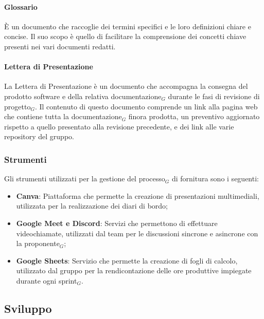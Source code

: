 \documentclass[10pt]{article}
\begin{document}
\begin{justify}
        \paragraph{Glossario}
        È un documento che raccoglie dei termini specifici e le loro definizioni chiare e concise. Il suo scopo è quello di facilitare la comprensione dei concetti chiave presenti nei vari documenti redatti.\\

        \paragraph{Lettera di Presentazione}
        La Lettera di Presentazione è un documento che accompagna la consegna del prodotto software e della relativa documentazione$_G$ durante le fasi di revisione di progetto$_G$. Il contenuto di questo documento comprende un link alla pagina web che contiene tutta la documentazione$_G$ finora prodotta, un preventivo aggiornato rispetto a quello presentato alla revisione precedente, e dei link alle varie repository del gruppo.\\

    \subsubsection{Strumenti}
    Gli strumenti utilizzati per la gestione del processo$_G$ di fornitura sono i seguenti:
    \begin{itemize}
        \item \textbf{Canva}: Piattaforma che permette la creazione di presentazioni multimediali, utilizzata per la realizzazione dei diari di bordo;
        \item \textbf{Google Meet e Discord}: Servizi che permettono di effettuare videochiamate, utilizzati dal team per le discussioni sincrone e asincrone con la proponente$_G$;
        \item \textbf{Google Sheets}: Servizio che permette la creazione di fogli di calcolo, utilizzato dal gruppo per la rendicontazione delle ore produttive impiegate durante ogni sprint$_G$.
    \end{itemize}

    \subsection{Sviluppo}


\end{justify}
\end{document}
